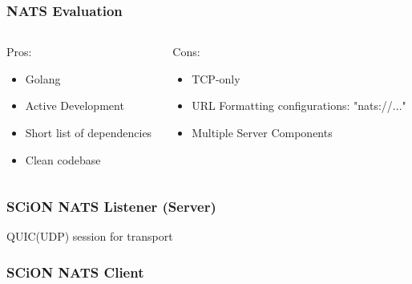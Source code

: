 \documentclass[aspectratio=169]{beamer}
\begin{document}
\begin{frame}
  \frametitle{NATS Evaluation}
    \begin{columns}[t]
      \begin{column}{0.48\linewidth}
        \pause
        Pros:
        \begin{itemize}
            \item<3-> Golang
            \item<4-> Active Development
            \item<5-> Short list of dependencies
            \item<6-> Clean codebase
        \end{itemize}
    \end{column}
    \begin{column}{0.48\linewidth}
        Cons:
        \pause
        \begin{itemize}
            \item<7-> TCP-only
            \item<8-> URL Formatting configurations: "nats://..."
            \item<9-> Multiple Server Components
        \end{itemize}
    \end{column}
  \end{columns}
\end{frame}

\begin{frame}
  \frametitle{SCiON NATS Listener (Server)}
  \begin{center}
    \small QUIC(UDP) session for transport
    
  \end{center}
\end{frame}

\begin{frame}
  \frametitle{SCiON NATS Client}
  \begin{center}
    
  \end{center}
\end{frame}
\end{document}

